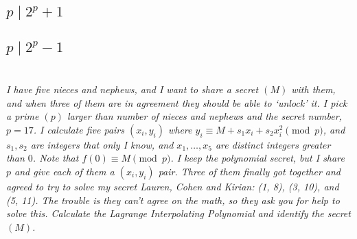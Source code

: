 \documentclass[12pt]{article}
\begin{document}
    \subsection{$p \mid 2^p + 1$}

    \subsection{$p \mid 2^p - 1$}

\newpage

\section{} \textit{I have five nieces and nephews, and I want to share a secret $(M)$ with them, and when three of them are in agreement they should be able to `unlock' it. I pick a prime $(p)$ larger than number of nieces and nephews and the secret number, $p = 17$. I calculate five pairs $(x_i, y_i)$ where $y_i \equiv M + s_1 x_i + s_2 x_i ^ 2\pmod{p}$, and $s_1, s_2$ are integers that only I know, and $x_1, \dots, x_5$ are distinct integers greater than $0$. Note that $f(0) \equiv M \pmod{p}$. I keep the polynomial secret, but I share $p$ and give each of them a $(x_i, y_i)$ pair. Three of them finally got together and agreed to try to solve my secret Lauren, Cohen and Kirian: (1, 8), (3, 10), and (5, 11). The trouble is they can't agree on the math, so they ask you for help to solve this. Calculate the Lagrange Interpolating Polynomial and identify the secret $(M)$.}
\end{document}
